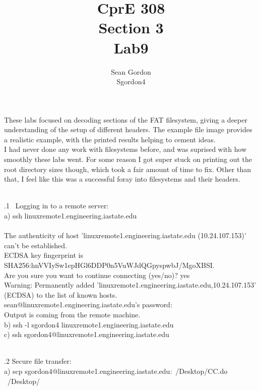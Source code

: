 \documentclass[12pt]{article}
\title{CprE 308\\Section 3\\Lab9}
\author{Sean Gordon\\Sgordon4}
\begin{document}
\maketitle

\noindent These labs focused on decoding sections of the FAT filesystem, giving a deeper understanding of the setup of different headers. The example file image provides a realistic example, with the printed results helping to cement ideas.\\

\noindent I had never done any work with filesystems before, and was suprised with how smoothly these labs went. For some reason I got super stuck on printing out the root directory sizes though, which took a fair amount of time to fix. Other than that, I feel like this was a successful foray into filesystems and their headers.\\\\

\pagebreak

.1 \ Logging in to a remote server:\\

a) ssh linuxremote1.engineering.iastate.edu\\\\
The authenticity of host 'linuxremote1.engineering.iastate.edu (10.24.107.153)' can't be established.\\
ECDSA key fingerprint is SHA256:hnVVIySw1epHGl6DDP0n5VuWJdQGpyspwbJ/MgoXBSI.\\
Are you sure you want to continue connecting (yes/no)? yes\\
Warning: Permanently added 'linuxremote1.engineering.iastate.edu,10.24.107.153' (ECDSA) to the list of known hosts.\\
sean@linuxremote1.engineering.iastate.edu's password: \\

\noindent Output is coming from the remote machine.\\

b) ssh -l sgordon4 linuxremote1.engineering.iastate.edu\\

c) ssh sgordon4@linuxremote1.engineering.iastate.edu\\

\hrulefill\\
\pagebreak

.2 Secure file transfer:\\

a) scp sgordon4@linuxremote1.engineering.iastate.edu:~/Desktop/CC.do ~/Desktop/\\
\end{document}
